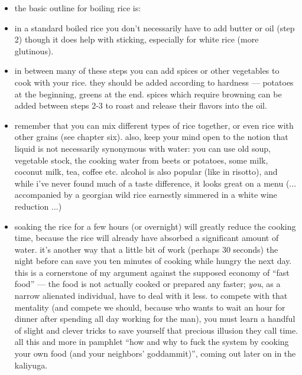 \begin{itemize}

  \item the basic outline for boiling rice is:


  \item in a standard boiled rice you don't necessarily have to add
  butter or oil (step 2) though it does help with sticking, especially
  for white rice (more glutinous).

  \item in between many of these steps you can add spices or other
  vegetables to cook with your rice. they should be added according to
  hardness --- potatoes at the beginning, greens at the end. spices
  which require browning can be added between steps 2-3 to roast and
  release their flavors into the oil.

  \item remember that you can mix different types of rice together, or
  even rice with other grains (see chapter six). also, keep your mind
  open to the notion that liquid is not necessarily synonymous with
  water: you can use old soup, vegetable stock, the cooking water from
  beets or potatoes, some milk, coconut milk, tea, coffee etc. alcohol
  is also popular (like in risotto), and while i've never found much
  of a taste difference, it looks great on a menu (... accompanied by
  a georgian wild rice earnestly simmered in a white wine reduction
  ...)

  \item soaking the rice for a few hours (or overnight) will greatly
  reduce the cooking time, because the rice will already have absorbed
  a significant amount of water. it's another way that a little bit of
  work (perhaps 30 seconds) the night before can save you ten minutes
  of cooking while hungry the next day. this is a cornerstone of my
  argument against the supposed economy of ``fast food'' --- the food
  is not actually cooked or prepared any faster; \textit{you}, as a
  narrow alienated individual, have to deal with it less. to compete
  with that mentality (and compete we should, because who wants to
  wait an hour for dinner after spending all day working for the man),
  you must learn a handful of slight and clever tricks to save
  yourself that precious illusion they call time. all this and more in
  pamphlet ``how and why to fuck the system by cooking your own food
  (and your neighbors' goddammit)'', coming out later on in the
  kaliyuga.

\end{itemize}

